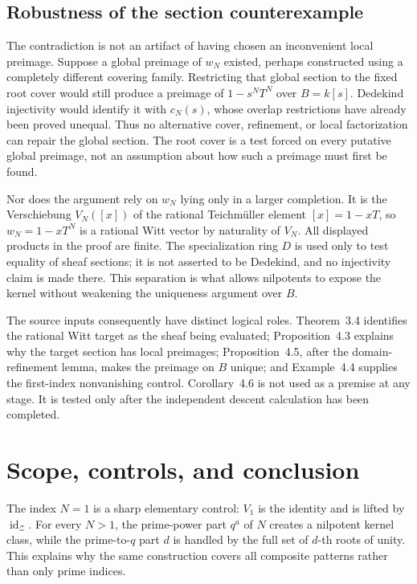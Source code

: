 \documentclass[11pt]{article}
\theoremstyle{definition}
\newcommand{\Zsh}{\mathcal Z}
\begin{document}
\subsection{Robustness of the section counterexample}

The contradiction is not an artifact of having chosen an inconvenient
local preimage.  Suppose a global preimage of \(w_N\) existed, perhaps
constructed using a completely different covering family.  Restricting
that global section to the fixed root cover would still produce a preimage
of \(1-s^NT^N\) over \(B=k[s]\).  Dedekind injectivity would identify it
with \(c_N(s)\), whose overlap restrictions have already been proved
unequal.  Thus no alternative cover, refinement, or local factorization can
repair the global section.  The root cover is a test forced on every
putative global preimage, not an assumption about how such a preimage must
first be found.

Nor does the argument rely on \(w_N\) lying only in a larger completion.
It is the Verschiebung \(V_N([x])\) of the rational Teichm\"uller element
\([x]=1-xT\), so \(w_N=1-xT^N\) is a rational Witt vector by naturality of
\(V_N\).  All displayed products in the proof are finite.  The
specialization ring \(D\) is used only to test equality of sheaf sections;
it is not asserted to be Dedekind, and no injectivity claim is made there.
This separation is what allows nilpotents to expose the kernel without
weakening the uniqueness argument over \(B\).

The source inputs consequently have distinct logical roles.
Theorem~3.4 identifies the rational Witt target as the sheaf being
evaluated; Proposition~4.3 explains why the target section has local
preimages; Proposition~4.5, after the domain-refinement lemma, makes the
preimage on \(B\) unique; and Example~4.4 supplies the first-index
nonvanishing control.  Corollary~4.6 is not used as a premise at any stage.
It is tested only after the independent descent calculation has been
completed.

\section{Scope, controls, and conclusion}\label{sec:scope}

The index \(N=1\) is a sharp elementary control: \(V_1\) is the identity
and is lifted by \(\operatorname{id}_{\Zsh}\).  For every \(N>1\), the
prime-power part \(q^a\) of \(N\) creates a nilpotent kernel class, while
the prime-to-\(q\) part \(d\) is handled by the full set of \(d\)-th roots
of unity.  This explains why the same construction covers all composite
patterns rather than only prime indices.
\end{document}
